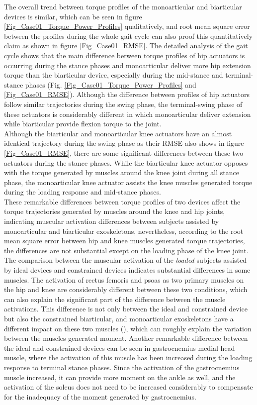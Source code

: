 \documentclass[10pt,letterpaper]{article}
\begin{document}
The overall trend between torque profiles of the monoarticular and biarticular devices is similar, which can be seen in figure \ref{Fig_Case01_Torque_Power_Profiles} qualitatively, and root mean square error between the profiles during the whole gait cycle can also proof this quantitatively claim as shown in figure \ref{Fig_Case01_RMSE}. The detailed analysis of the gait cycle shows that the main difference between torque profiles of hip actuators is occurring during the stance phases and monoarticular deliver more hip extension torque than the biarticular device, especially during the mid-stance and terminal-stance phases (Fig. \ref{Fig_Case01_Torque_Power_Profiles} and \ref{Fig_Case01_RMSE}). Although the difference between profiles of hip actuators follow similar trajectories during the swing phase, the terminal-swing phase of these actuators is considerably different in which monoarticular deliver extension while biarticular provide flexion torque to the joint.\\
Although the biarticular and monoarticular knee actuators have an almost identical trajectory during the swing phase as their RMSE also shows in figure \ref{Fig_Case01_RMSE}, there are some significant differences between these two actuators during the stance phases. While the biarticular knee actuator opposes with the torque generated by muscles around the knee joint during all stance phase, the monoarticular knee actuator assists the knee muscles generated torque during the loading response and mid-stance phases.\\ These remarkable differences between torque profiles of two devices affect the torque trajectories generated by muscles around the knee and hip joints, indicating muscular activation differences between subjects assisted by monoarticular and biarticular exoskeletons, nevertheless, according to the root mean square error between hip and knee muscles generated torque trajectories, the differences are not substantial except on the loading phase of the knee joint.\\
The comparison between the muscular activation of the {\it loaded} subjects assisted by ideal devices and constrained devices indicates substantial differences in some muscles. The activation of rectus femoris and psoas as two primary muscles on the hip and knee are considerably different between these two conditions, which can also explain the significant part of the difference between the muscle activations. This difference is not only between the ideal and constrained device but also the constrained biarticular, and monoarticular exoskeletons have a different impact on these two muscles (), which can roughly explain the variation between the muscles generated moment. Another remarkable difference between the ideal and constrained devices can be seen in gastrocnemius medial head muscle, where the activation of this muscle has been increased during the loading response to terminal stance phases. Since the activation of the gastrocnemius muscle increased, it can provide more moment on the ankle as well, and the activation of the soleus does not need to be increased considerably to compensate for the inadequacy of the moment generated by gastrocnemius.
\end{document}
